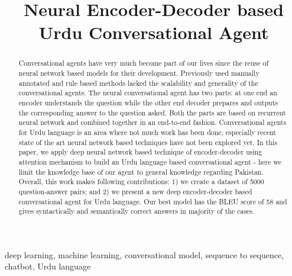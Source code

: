 \documentclass[conference]{IEEEtran}
\begin{document}
\title{Neural Encoder-Decoder based Urdu Conversational Agent\\
}

\author{
\and
{}
}

\maketitle

\begin{abstract}
Conversational agents have very much become part of our lives since the reuse of neural network based models for their development. Previously used manually annotated and rule based methods lacked the scalability and generality of the conversational agents. The neural conversational agent has two parts: at one end an encoder understands the question while the other  end decoder prepares and outputs the corresponding answer to the question asked. Both the parts are based on recurrent neural network and combined together in an end-to-end fashion. Conversational agents for Urdu language is an area where not much work has been done, especially recent state of the art neural network based techniques have not been explored yet. In this paper, we apply deep neural network based technique of encoder-decoder using attention mechanism to build an Urdu language based conversational agent - here we limit the knowledge base of our agent to general knowledge regarding Pakistan. Overall, this work makes following contributions: 1) we create a dataset of 5000 question-answer pairs; and 2) we present a new deep encoder-decoder based conversational agent for Urdu language. Our best model has the BLEU score of 58 and gives syntactically and semantically correct answers in majority of the cases.
\end{abstract}

\begin{IEEEkeywords}
deep learning, machine learning, conversational model, sequence to sequence, chatbot, Urdu language
\end{IEEEkeywords}
\end{document}
